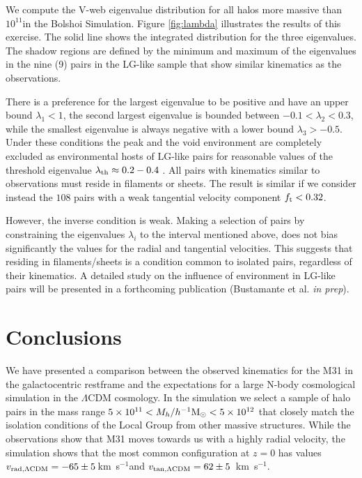 \documentclass{emulateapj}
\newcommand{\kms}{\,km~s$^{-1}$}
\newcommand{\hMsun}{{\ifmmode{h^{-1}{\rm {M_{\odot}}}}\else{$h^{-1}{\rm{M_{\odot}}}$}\fi}}
\begin{document}
We compute the V-web eigenvalue distribution for all halos more massive than $10^{11}$\hMsun in the Bolshoi Simulation. Figure \ref{fig:lambda} illustrates the results of this exercise. The solid line shows the integrated distribution for the three eigenvalues. The shadow regions are defined by the minimum and maximum of the eigenvalues in the nine (9) pairs in the LG-like sample that show similar kinematics as the observations. 


There is a preference for the largest eigenvalue to be positive  and have an upper bound $\lambda_{1}<1$, the second largest eigenvalue is bounded between $-0.1 < \lambda_{2} < 0.3$, while the smallest eigenvalue is always negative with a lower bound $\lambda_{3}>-0.5$. Under these conditions the peak and the void environment are completely excluded as environmental hosts of LG-like pairs for reasonable values of the threshold eigenvalue $\lambda_{\rm th}\approx 0.2-0.4$ \citep{Hoffman12,Libeskind12}. All pairs with kinematics similar to observations must reside in filaments or sheets. The result is similar if we consider instead the $108$ pairs with a weak tangential velocity component $f_{\rm t}<0.32$. 

However, the inverse condition is weak. Making a selection of pairs by constraining the eigenvalues $\lambda_{i}$ to the interval mentioned above, does not bias significantly the values for the radial and tangential velocities. This suggests that residing in filaments/sheets is a condition common to isolated pairs, regardless of their kinematics. A detailed study on the influence of environment in LG-like pairs will be presented in a forthcoming publication (Bustamante et al. {\it in prep}).



\section{Conclusions}
We have presented a comparison between the observed kinematics for the M31 in the galactocentric restframe and the expectations for a large N-body cosmological simulation in the $\Lambda$CDM cosmology. In the simulation we select a sample of halo pairs in the mass range $5\times 10^{11}<M_{h}/\hMsun<5\times 10^{12}$ that closely match the isolation conditions of the Local Group from other massive structures. While the observations show that M31 moves towards us with a highly radial velocity, the simulation shows that the most common configuration at $z=0$ has values $v_{\rm rad, \Lambda CDM}=-65\pm5$\kms and $v_{\rm tan, \Lambda CDM}=62\pm5$ \kms. 
\end{document}
